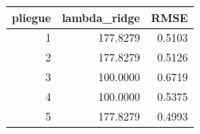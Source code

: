 \begin{tabular}{rrr}
\toprule
pliegue & lambda\_ridge & RMSE \\
\midrule
1 & 177.8279 & 0.5103 \\
2 & 177.8279 & 0.5126 \\
3 & 100.0000 & 0.6719 \\
4 & 100.0000 & 0.5375 \\
5 & 177.8279 & 0.4993 \\
\bottomrule
\end{tabular}
